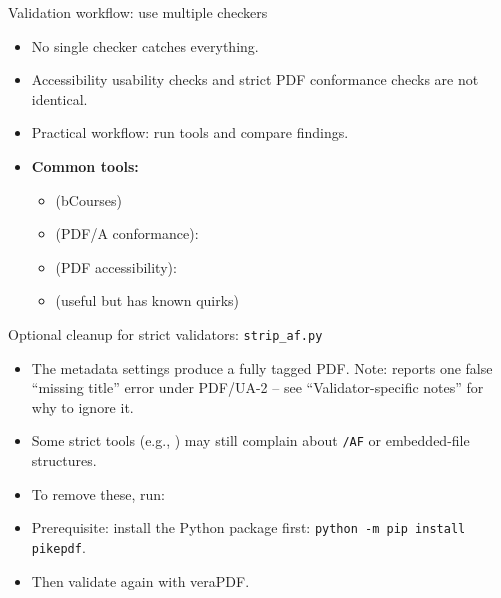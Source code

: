 \begin{frame}{Validation workflow: use multiple checkers}
\begin{itemize}
\item No single checker catches everything.
\item Accessibility usability checks and strict PDF conformance checks are not identical.
\item Practical workflow: run  tools and compare findings.

\bigskip

\item \textbf{Common tools:}
  \begin{itemize}
  \item {} (bCourses)
  \item {} (PDF/A conformance): 
  \item {} (PDF accessibility): 
  \item {} (useful but has known quirks)
  \end{itemize}
\end{itemize}
\end{frame}

\begin{frame}{Optional cleanup for strict validators: \texttt{strip\_af.py}}
\begin{itemize}
\item The metadata settings produce a fully tagged PDF. Note:  reports one false ``missing title'' error under PDF/UA-2 -- see ``Validator-specific notes'' for why to ignore it.
\item Some strict tools (e.g., ) may still complain about \texttt{/AF} or embedded-file structures.
\item To remove these, run:

\bigskip


\bigskip

\item Prerequisite: install the Python package  first: \texttt{python -m pip install pikepdf}.
\item Then validate again with veraPDF.
\end{itemize}
\end{frame}


